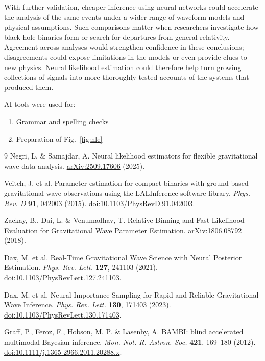 \documentclass[11pt,a4paper]{article}
\begin{document}
With further validation, cheaper inference using neural networks could accelerate the analysis of the same events under a wider range of waveform models and physical assumptions. Such comparisons matter when researchers investigate how black hole binaries form or search for departures from general relativity. Agreement across analyses would strengthen confidence in these conclusions; disagreements could expose limitations in the models or even provide clues to new physics. Neural likelihood estimation could therefore help turn growing collections of signals into more thoroughly tested accounts of the systems that produced them.

\vspace{15pt}

AI tools were used for:
\begin{enumerate}
  \item Grammar and spelling checks
  \item Preparation of Fig.~\ref{fig:nle}
\end{enumerate}

\begin{thebibliography}{9}
  \small
  Negri, L. \& Samajdar, A.
  Neural likelihood estimators for flexible gravitational wave data analysis.
  \href{https://arxiv.org/abs/2509.17606}{arXiv:2509.17606} (2025).

  Veitch, J. et al.
  Parameter estimation for compact binaries with ground-based gravitational-wave
  observations using the LALInference software library.
  \textit{Phys. Rev. D} \textbf{91}, 042003 (2015).
  \href{https://doi.org/10.1103/PhysRevD.91.042003}{doi:10.1103/PhysRevD.91.042003}.

  Zackay, B., Dai, L. \& Venumadhav, T.
  Relative Binning and Fast Likelihood Evaluation for Gravitational Wave Parameter Estimation.
  \href{https://arxiv.org/abs/1806.08792}{arXiv:1806.08792} (2018).

  Dax, M. et al.
  Real-Time Gravitational Wave Science with Neural Posterior Estimation.
  \textit{Phys. Rev. Lett.} \textbf{127}, 241103 (2021).
  \href{https://doi.org/10.1103/PhysRevLett.127.241103}{doi:10.1103/PhysRevLett.127.241103}.

  Dax, M. et al.
  Neural Importance Sampling for Rapid and Reliable Gravitational-Wave Inference.
  \textit{Phys. Rev. Lett.} \textbf{130}, 171403 (2023).
  \href{https://doi.org/10.1103/PhysRevLett.130.171403}{doi:10.1103/PhysRevLett.130.171403}.

  Graff, P., Feroz, F., Hobson, M. P. \& Lasenby, A.
  BAMBI: blind accelerated multimodal Bayesian inference.
  \textit{Mon. Not. R. Astron. Soc.} \textbf{421}, 169--180 (2012).
  \href{https://doi.org/10.1111/j.1365-2966.2011.20288.x}{doi:10.1111/j.1365-2966.2011.20288.x}.
\end{thebibliography}
\end{document}
